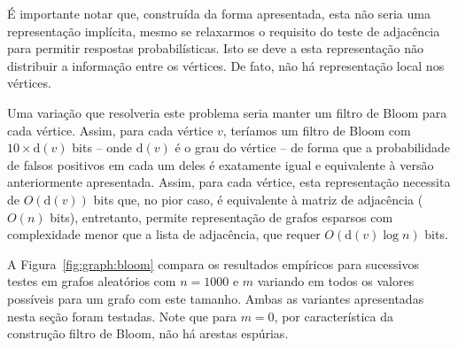 É importante notar que, construída da forma apresentada, esta não seria uma representação implícita, mesmo se relaxarmos o requisito do teste de adjacência para permitir respostas probabilísticas. Isto se deve a esta representação não distribuir a informação entre os vértices. De fato, não há representação local nos vértices.

Uma variação que resolveria este problema seria manter um filtro de Bloom para cada vértice. Assim, para cada vértice $v$, teríamos um filtro de Bloom com $10 \times \text{d}(v)$ bits -- onde $\text{d}(v)$ é o grau do vértice -- de forma que a probabilidade de falsos positivos em cada um deles é exatamente igual e equivalente à versão anteriormente apresentada. Assim, para cada vértice, esta representação necessita de $O(\text{d}(v))$ bits que, no pior caso, é equivalente à matriz de adjacência ($O(n)$ bits), entretanto, permite representação de grafos esparsos com complexidade menor que a lista de adjacência, que requer $O(\text{d}(v) \log n)$ bits.

A Figura~\ref{fig:graph:bloom} compara os resultados empíricos para sucessivos testes em grafos aleatórios com $n = 1000$ e $m$ variando em todos os valores possíveis para um grafo com este tamanho. Ambas as variantes apresentadas nesta seção foram testadas. Note que para $m=0$, por característica da construção filtro de Bloom, não há arestas espúrias.

